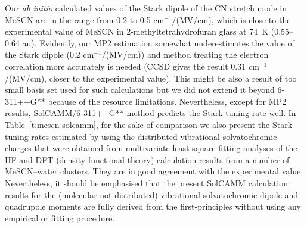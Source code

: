 \documentclass[b5paper,oneside,fleqn,11pt]{book}
\begin{document}
\begin{refsection}
Our \emph{ab initio} calculated values
of the Stark dipole of the CN stretch mode in MeSCN are in the range
from 0.2 to 0.5 cm$^{-1}$/(MV/cm), which is close to the
experimental value of MeSCN in 2-methyltetrahydrofuran
glass at 74~K (0.55--0.64 au). \citep{Suydam.Boxer.Biochem.2003} 
Evidently, our MP2 estimation
somewhat underestimates the value of the Stark dipole (0.2
cm$^{-1}$/(MV/cm)) and method treating the electron correlation
more accurately is needed (CCSD gives the result 0.31
cm$^{-1}$/(MV/cm), closer to the experimental value). This might be
also a result of too small basis set used for such calculations
but we did not extend it beyond 6-311++G** because of the
resource limitations. Nevertheless, except for MP2 results,
SolCAMM/6-311++G** method predicts the Stark tuning
rate well. In Table~\ref{t:mescn-solcamm}, for the sake of comparison we also
present the Stark tuning rates estimated by using the
distributed vibrational solvatochromic charges that were
obtained from multivariate least square fitting analyses of the
HF and DFT (density functional theory) calculation results from
a number of MeSCN--water clusters. They are in good
agreement with the experimental value. Nevertheless, it
should be emphasised that the present SolCAMM calculation
results for the (molecular not distributed) vibrational
solvatochromic dipole and quadrupole moments are fully
derived from the first\hyp{}principles without using any empirical or
fitting procedure.


\end{refsection}
\end{document}
